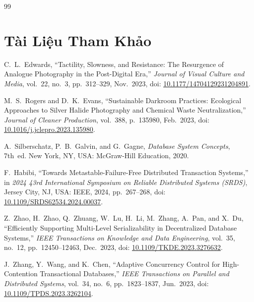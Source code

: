 \renewcommand{\bibname}{}

\begin{thebibliography}{99}
\chapter*{Tài Liệu Tham Khảo}

\setlength{\itemsep}{0.6em}
\setlength{\parskip}{0pt}

C.~L.~Edwards, ``Tactility, Slowness, and Resistance: The Resurgence of Analogue Photography in the Post-Digital Era,'' \textit{Journal of Visual Culture and Media}, vol.~22, no.~3, pp.~312--329, Nov.~2023, doi: \href{https://doi.org/10.1177/14704129231204891}{10.1177/14704129231204891}.

M.~S.~Rogers and D.~K.~Evans, ``Sustainable Darkroom Practices: Ecological Approaches to Silver Halide Photography and Chemical Waste Neutralization,'' \textit{Journal of Cleaner Production}, vol.~388, p.~135980, Feb.~2023, doi: \href{https://doi.org/10.1016/j.jclepro.2023.135980}{10.1016/j.jclepro.2023.135980}.

A.~Silberschatz, P.~B.~Galvin, and G.~Gagne, \textit{Database System Concepts}, 7th~ed. New York, NY, USA: McGraw-Hill Education, 2020.

F.~Habibi, ``Towards Metastable-Failure-Free Distributed Transaction Systems,'' in \textit{2024 43rd International Symposium on Reliable Distributed Systems (SRDS)}, Jersey City, NJ, USA: IEEE, 2024, pp.~267--268, doi: \href{https://doi.org/10.1109/SRDS62534.2024.00037}{10.1109/SRDS62534.2024.00037}.

Z.~Zhao, H.~Zhao, Q.~Zhuang, W.~Lu, H.~Li, M.~Zhang, A.~Pan, and X.~Du, ``Efficiently Supporting Multi-Level Serializability in Decentralized Database Systems,'' \textit{IEEE Transactions on Knowledge and Data Engineering}, vol.~35, no.~12, pp.~12450--12463, Dec.~2023, doi: \href{https://doi.org/10.1109/TKDE.2023.3276632}{10.1109/TKDE.2023.3276632}.

J.~Zhang, Y.~Wang, and K.~Chen, ``Adaptive Concurrency Control for High-Contention Transactional Databases,'' \textit{IEEE Transactions on Parallel and Distributed Systems}, vol.~34, no.~6, pp.~1823--1837, Jun.~2023, doi: \href{https://doi.org/10.1109/TPDS.2023.3262104}{10.1109/TPDS.2023.3262104}.


\end{thebibliography}
